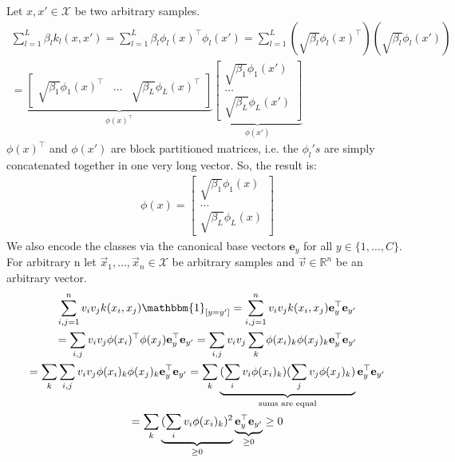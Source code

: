\documentclass[a4paper]{article}
\newcommand{\e}{\textbf{e}}
\newcommand{\1}{\mathds{1}}
\begin{document}
Let $x,x'\in \mathcal{X}$ be two arbitrary samples.
\begin{gather*}
	\sum_{l=1}^L \beta_l k_l(x,x') 
	= 
	\sum_{l=1}^L \beta_l \phi_l(x)^\top \phi_l(x') 
	=
	\sum_{l=1}^L (\sqrt{\beta_l} \phi_l(x)^\top) (\sqrt{\beta_l} \phi_l(x'))
	\\
	=
\underbrace{
\begin{bmatrix}
	\sqrt{\beta_1} \phi_1(x)^\top	& \dots	& \sqrt{\beta_L} \phi_L(x)^\top      
\end{bmatrix}
}_{\phi(x)^\top}
\underbrace{
\begin{bmatrix}
	\sqrt{\beta_1} \phi_1(x')	\\
	\dots	\\
	\sqrt{\beta_L} \phi_L(x')      
\end{bmatrix}
}_{\phi(x')}
\end{gather*}
$\phi(x)^\top$ and $\phi(x')$ are block partitioned matrices, 
i.e. the $\phi_l's$ are simply concatenated 
together in one very long vector. So, the result is: 
\begin{gather*}
	\phi(x) = 
	\begin{bmatrix}
		\sqrt{\beta_1} \phi_1(x)	\\
		\dots	\\
		\sqrt{\beta_L} \phi_L(x)      
	\end{bmatrix}
\end{gather*}
\newpage 
{}
We also encode the classes via the canonical base vectors 
$\e_y$ for all $y\in \{1,\ldots,C\}$.
For arbitrary n let $\vec{x}_1, \ldots, \vec{x}_n \in \mathcal{X}$ be arbitrary samples 
and $\vec{v}\in\mathbb{R}^n$ be an arbitrary vector.
\begin{gather*}
	\sum_{i,j=1}^n v_i v_j k(x_i,x_j) \mathbbm{1}_{[y=y']}
	=
	\sum_{i,j=1}^n v_i v_j k(x_i,x_j) \e_y^\top \e_{y'} 
	\\
	=
	\sum_{i,j} v_i v_j \phi(x_i)^\top \phi(x_j) \e_y^\top \e_{y'}
	=
	\sum_{i,j} v_i v_j \sum_k \phi(x_i)_k \phi(x_j)_k \e_y^\top \e_{y'}
	\\
	=
	\sum_k \sum_{i,j} v_i v_j \phi(x_i)_k \phi(x_j)_k \e_y^\top \e_{y'}
	=
	\sum_k \underbrace{(\sum_{i} v_i \phi(x_i)_k) (\sum_{j}v_j \phi(x_j)_k)}_{\text{sums are equal}} 
	\e_y^\top \e_{y'}
	\\
	=
	\sum_k \underbrace{(\sum_{i} v_i \phi(x_i)_k)^2}_{\geq 0}  \underbrace{\e_y^\top \e_{y'}}_{\geq 0}
	\geq 0
\end{gather*}
\end{document}

